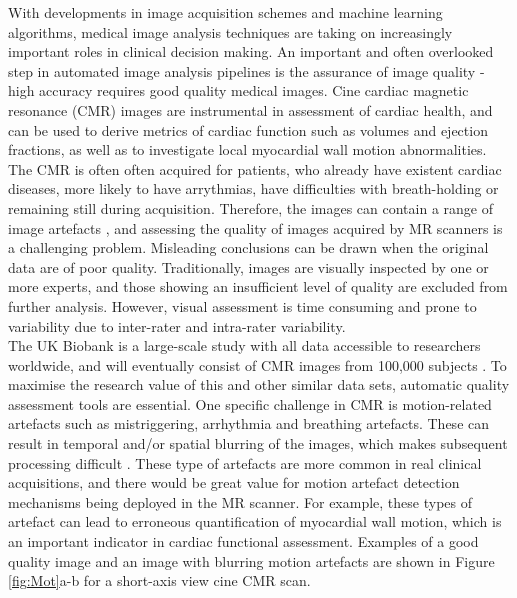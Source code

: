 \documentclass[preprint,12pt,authoryear]{elsarticle}
\begin{document}
With developments in image acquisition schemes and machine learning algorithms, medical image analysis techniques are taking on increasingly important roles in clinical decision making.
An important and often overlooked step in automated image analysis pipelines is the assurance of image quality - high accuracy requires good quality medical images. Cine  cardiac magnetic resonance (CMR) images are instrumental in assessment of cardiac health, and can be used to derive metrics of cardiac function such as volumes and ejection fractions, as well as to investigate local myocardial wall motion abnormalities.  The CMR is often often acquired for patients, who already have existent cardiac diseases, more likely to have arrythmias, have difficulties with breath-holding  or remaining still during acquisition. Therefore, the images can contain a range of image artefacts \citep{Ferreira2013}, and assessing the quality of images acquired by MR scanners is a challenging problem. Misleading conclusions can be drawn when the original data are of poor quality. Traditionally, images are visually inspected by one or more experts, and those showing an insufficient level of quality are excluded from further analysis. However, visual assessment is time consuming and prone to variability due to inter-rater and intra-rater variability.\\

The UK Biobank is a large-scale study with all data accessible to researchers worldwide, and will eventually consist of CMR images from 100,000 subjects \citep{Petersen2015}. To maximise the research value of this and other similar data sets, automatic quality assessment tools are essential. One specific challenge in CMR is motion-related artefacts such as mistriggering, arrhythmia and breathing artefacts. These can result in temporal and/or spatial blurring of the images, which makes subsequent processing difficult \citep{Ferreira2013}. These type of artefacts are more common in real clinical acquisitions, and there would be great value for motion artefact detection mechanisms being deployed in the MR scanner.
For example, these types of artefact can lead to erroneous quantification of myocardial wall motion, which is an important indicator in cardiac functional assessment. Examples of a good quality image and an image with blurring motion artefacts are shown in Figure \ref{fig:Mot}a-b for a short-axis view cine CMR scan.\\

\end{document}
